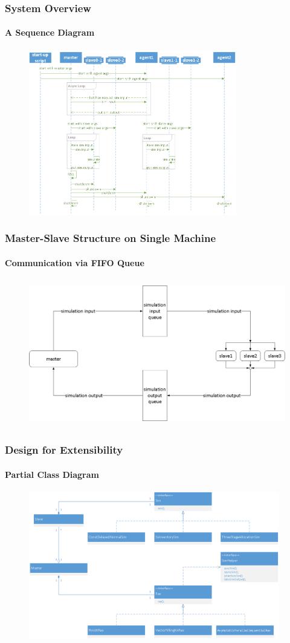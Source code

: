 \documentclass{beamer}
\begin{document}
\begin{frame}
\frametitle{System Overview}
\framesubtitle{A Sequence Diagram}
\begin{figure}[ht]
\centering
\includegraphics[height=72mm]{overview_seq.png}
\end{figure}
\end{frame}

\begin{frame}
\frametitle{Master-Slave Structure on Single Machine}
\framesubtitle{Communication via FIFO Queue}
\begin{figure}[ht]
\centering
\includegraphics[height=64mm]{master-slave-queue.png}
\end{figure}
\end{frame}

\begin{frame}
\frametitle{Design for Extensibility}
\framesubtitle{Partial Class Diagram}
\begin{figure}[ht]
\centering
\includegraphics[height=64mm]{ras-sim-class.png}
\end{figure}
\end{frame}
\end{document}
